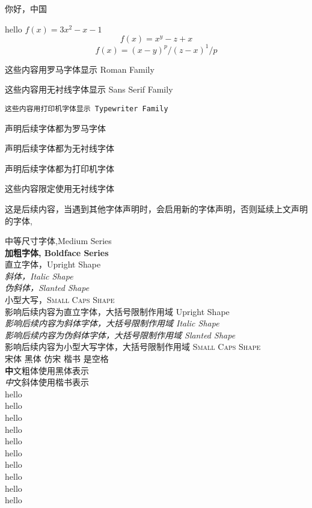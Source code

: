 \documentclass[]{ctexart}
\begin{document}
 
	你好，中国
	
 	hello $f(x)=3x^2-x-1$
 	$$ f(x)=x^y-z+x$$
 	$$ f(x)=(x-y)^p/(z-x)^1/p $$
 	
 	\textrm{这些内容用罗马字体显示 Roman Family}
 	
 	\textsf{这些内容用无衬线字体显示 Sans Serif Family}
 	
 	\texttt{这些内容用打印机字体显示 Typewriter Family}
 	
 	\rmfamily 声明后续字体都为罗马字体
 	
 	\sffamily 声明后续字体都为无衬线字体
 	
 	\ttfamily 声明后续字体都为打印机字体
 	
 	{\sffamily 这些内容限定使用无衬线字体}
 	
 	这是后续内容，当遇到其他字体声明时，会启用新的字体声明，否则延续上文声明的字体,
 	
 	\textmd{中等尺寸字体,Medium Series}  \\
	\textbf{加粗字体, Boldface Series} 	\\
	\textup{直立字体，Upright Shape}		\\
	\textit{斜体，Italic Shape}		\\
	\textsl{伪斜体，Slanted Shape}	\\
	\textsc{小型大写，Small Caps Shape}	\\
	{\upshape 影响后续内容为直立字体，大括号限制作用域 Upright Shape} \\
	{\itshape 影响后续内容为斜体字体，大括号限制作用域 Italic Shape} \\
	{\slshape 影响后续内容为伪斜体字体，大括号限制作用域 Slanted Shape} \\
	{\scshape 影响后续内容为小型大写字体，大括号限制作用域 Small Caps Shape} \\
	{\songti 宋体} \quad 
	{\heiti 黑体} \quad
	{\fangsong 仿宋} \quad
	{\kaishu 楷书} \quad 	
	\quad 是空格 \\
	{\textbf 中文粗体使用黑体表示}\\
	{\textit 中文斜体使用楷书表示} \\
	
	{\tiny 			hello}\\
	{\scriptsize 	hello}\\
	{\footnotesize	hello}\\
	{\small			hello}\\
	{\normalsize	hello}\\
	{\large			hello}\\
	{\Large			hello}\\
	{\LARGE			hello}\\
	{\huge			hello}\\
	{\Huge			hello}\\
	
\end{document}
